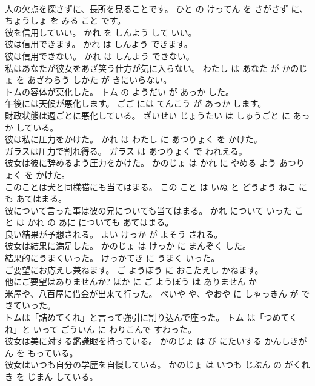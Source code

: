 \documentclass[8pt]{extreport}
\begin{document}
\begin{CJK}{UTF8}{min}
\\	人の欠点を探さずに、長所を見ることです。	ひと の けってん を さがさず に、ちょうしょ を みる こと です。	
\\	彼を信用していい。	かれ を しんよう して いい。	
\\	彼は信用できます。	かれ は しんよう できます。	
\\	彼は信用できない。	かれ は しんよう できない。	
\\	私はあなたが彼女をあざ笑う仕方が気に入らない。	わたし は あなた が かのじょ を あざわらう しかた が きにいらない。	
\\	トムの容体が悪化した。	トム の ようだい が あっか した。	
\\	午後には天候が悪化します。	ごご には てんこう が あっか します。	
\\	財政状態は週ごとに悪化している。	ざいせい じょうたい は しゅうごと に あっか している。	
\\	彼は私に圧力をかけた。	かれ は わたし に あつりょく を かけた。	
\\	ガラスは圧力で割れ得る。	ガラス は あつりょく で われえる。	
\\	彼女は彼に辞めるよう圧力をかけた。	かのじょ は かれ に やめる よう あつりょく を かけた。	
\\	このことは犬と同様猫にも当てはまる。	この こと は いぬ と どうよう ねこ にも あてはまる。	
\\	彼について言った事は彼の兄についても当てはまる。	かれ について いった こと は かれ の あに についても あてはまる。	
\\	良い結果が予想される。	よい けっか が よそう される。	
\\	彼女は結果に満足した。	かのじょ は けっか に まんぞく した。	
\\	結果的にうまくいった。	けっかてき に うまく いった。	
\\	ご要望にお応えし兼ねます。	ご ようぼう に おこたえし かねます。	
\\	他にご要望はありませんか?	ほか に ご ようぼう は ありません か 
\\	米屋や、八百屋に借金が出来て行った。	べいや や、やおや に しゃっきん が できていった。	
\\	トムは「詰めてくれ」と言って強引に割り込んで座った。	トム は「つめてくれ」と いって ごういん に わりこんで すわった。	
\\	彼女は美に対する鑑識眼を持っている。	かのじょ は び にたいする かんしきがん を もっている。	
\\	彼女はいつも自分の学歴を自慢している。	かのじょ は いつも じぶん の がくれき を じまん している。	

\end{CJK}
\end{document}
